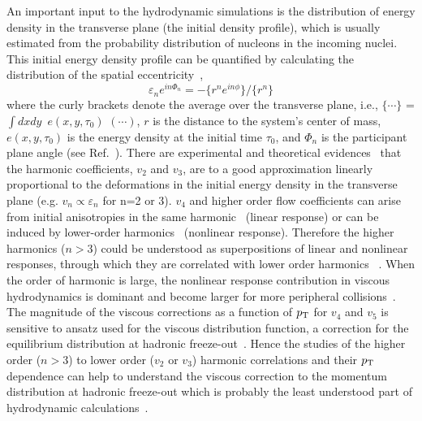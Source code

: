 An important input to the hydrodynamic simulations is the distribution of energy density in the transverse plane (the initial density profile), which is usually estimated from the probability distribution of nucleons in the incoming nuclei.
This initial energy density profile can be quantified by calculating the distribution of the spatial eccentricity~\cite{Alver:2010gr},
\begin{equation}
 \varepsilon_{n} e^{in\Phi_{n}} = -\{r^n e^{in\phi}\}/ \{r^n\} 
  \label{eq:eccentricities}
\end{equation}
where the curly brackets denote the average over the transverse plane, i.e., $\{\cdots\}$ = $\int dxdy$\, $e(x,y,\tau_0)$ $(\cdots)$, $r$ is the distance to the system's center of mass, $e(x,y,\tau_0)$ is the energy density at the initial time $\tau_0$, and $\Phi_{n}$ is the participant plane angle (see Ref.~\cite{Teaney:2010vd,Niemi:2015qia}).
There are experimental and theoretical evidences~\cite{Alver:2010gr,Qiu:2011iv} that the harmonic coefficients, $v_2$ and $v_3$, are to a good approximation linearly proportional to the deformations in the initial energy density in the transverse plane (e.g. $v_n \propto \varepsilon_n$ for n=2 or 3).
$v_4$ and higher order flow coefficients can arise from initial anisotropies in the same harmonic~\cite{Alver:2010gr,Teaney:2010vd,Gubser:2010ui,Hatta:2014jva} (linear response) or can be induced by lower-order harmonics~\cite{Bravina:2013xla,Bravina:2013ora} (nonlinear response).
Therefore the higher harmonics ($n>3$) could be understood as superpositions of linear and nonlinear responses, through which they are correlated with lower order harmonics ~\cite{Teaney:2012ke,Bravina:2013ora,Gubser:2010ui,Hatta:2014jva}. When the order of harmonic is large, the nonlinear response contribution in viscous hydrodynamics is dominant and become larger for more peripheral collisions~\cite{Teaney:2012ke,Bravina:2013ora}.
The magnitude of the viscous corrections as a function of $p_{\rm T}$ for $v_4$ and $v_5$ is sensitive to ansatz used for the viscous distribution function, a correction for the equilibrium distribution at hadronic freeze-out~\cite{Luzum:2010ad,Teaney:2012ke}.
Hence the studies of the higher order ($n>3$) to lower order ($v_2$ or $v_3$) harmonic correlations and their $p_{\rm T}$ dependence can help to understand the viscous correction to the momentum distribution at hadronic freeze-out which is probably the least understood part of hydrodynamic calculations~\cite{Teaney:2012ke,Niemi:2015qia}.


